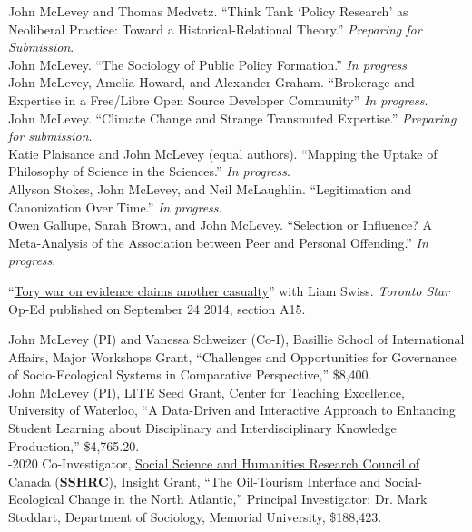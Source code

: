 \documentclass[9pt,usenames,dvipsnames]{article}
\begin{document}
\ind John McLevey and Thomas Medvetz. ``Think Tank ‘Policy Research' as Neoliberal Practice: Toward a Historical-Relational Theory.'' \emph{Preparing for Submission}. \\

\ind John McLevey. ``The Sociology of Public Policy Formation.'' \emph{In progress} \\

\ind John McLevey, Amelia Howard, and Alexander Graham. ``Brokerage and Expertise in a Free/Libre Open Source Developer Community'' \emph{In progress}.\\

\ind John McLevey. ``Climate Change and Strange Transmuted Expertise.'' \emph{Preparing for submission}. \\

\ind Katie Plaisance and John McLevey (equal authors). ``Mapping the Uptake of Philosophy of Science in the Sciences.'' \emph{In progress}.\\

\ind Allyson Stokes, John McLevey, and Neil McLaughlin. ``Legitimation and Canonization Over Time.'' \emph{In progress}.\\

\ind Owen Gallupe, Sarah Brown, and John McLevey. ``Selection or Influence? A Meta-Analysis of the Association between Peer and Personal Offending.'' \emph{In progress}. \\


\ind ``\href{http://bit.ly/1ohSn1N}{Tory war on evidence claims another casualty}'' with Liam Swiss. \emph{Toronto Star} Op-Ed published on September 24 2014, section A15. \\


\ind John McLevey (PI) and Vanessa Schweizer (Co-I), Basillie School of International Affairs, Major Workshops Grant, ``Challenges and Opportunities for Governance of Socio-Ecological Systems in Comparative Perspective,'' \$8,400. \\

\ind John McLevey (PI), LITE Seed Grant, Center for Teaching Excellence, University of Waterloo, ``A Data-Driven and Interactive Approach to Enhancing Student Learning about Disciplinary and Interdisciplinary Knowledge Production,'' \$4,765.20. \\

-2020 Co-Investigator, \href{http://www.sshrc-crsh.gc.ca/funding-financement/programs-programmes/insight_development_grants-su
bventions_de_developpement_savoir-eng.aspx}{Social Science and Humanities Research Council of Canada (\textbf{SSHRC})}, Insight Grant, ``The Oil-Tourism Interface and Social-Ecological Change in the North Atlantic,'' Principal Investigator: Dr. Mark Stoddart, Department of Sociology, Memorial University, \$188,423. \\
\end{document}
